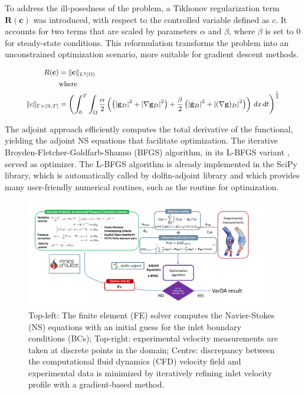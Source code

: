 To address the ill-posedness of the problem, a Tikhonov regularization term $\mathbf{R}(\mathbf{c})$ was introduced, with respect to the controlled variable defined as $c$. It accounts for two terms that are scaled by parameters \(\alpha\) and \(\beta\), where \(\beta\) is set to $0$ for steady-state conditions. This reformulation transforms the problem into an unconstrained optimization scenario, more suitable for gradient descent methods. 

\begin{equation}
\small
    \begin{aligned}
        R(\mathbf{c}) &= \| \mathbf{c} \|_{L^2(\Omega)} \\
        &\text{where} \\
        \small
        \|c\|_{\Gamma \times (0, T]} &= \left( \int_0^T \int_{\Omega} \frac{\alpha}{2} \left( \left(|\mathbf{g}_D|^2 + |\nabla \mathbf{g}_D|^2 \right) + \frac{\beta}{2} \left( |\dot{\mathbf{g}}_D|^2 +  |(\nabla \mathbf{g})_D|^2 \right) \right) \, dx \, dt \right)^{\frac{1}{2}}
    \end{aligned}
    \label{eq:12} 
\end{equation}

The adjoint approach efficiently computes the total derivative of the functional, yielding the adjoint NS equations that facilitate optimization. The iterative Broyden-Fletcher-Goldfarb-Shanno (BFGS) algorithm, in its L-BFGS variant \citep{Liu1989}, served as optimizer. The L-BFGS algorithm is already implemented in the SciPy library, which is automatically
called by dolfin-adjoint library and which provides many user-friendly numerical routines, such as the routine for optimization.


\begin{figure}
    \centering
    \includegraphics[width=0.95\textwidth]{chapters/paratico/Fig1.1.pdf}
    \caption{Top-left: The finite element (FE) solver computes the Navier-Stokes (NS) equations with an initial guess for the inlet boundary conditions (BCs); Top-right: experimental velocity measurements are taken at discrete points in the domain; Centre: discrepancy between the computational fluid dynamics (CFD) velocity field and experimental data is minimized by iteratively refining inlet velocity profile with a gradient-based method.}
    \label{fig:scheme}
\end{figure}

